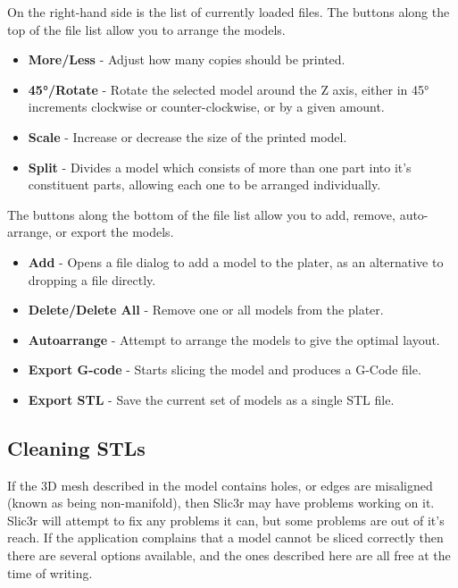 On the right-hand side is the list of currently loaded files.  The buttons along the top of the file list allow you to arrange the models.
\begin{itemize}
	\item \textbf{More/Less}  - Adjust how many copies should be printed.
	\item \textbf{45°/Rotate}  - Rotate the selected model around the Z axis, either in 45° increments clockwise or counter-clockwise, or by a given amount.
	\item \textbf{Scale}  - Increase or decrease the size of the printed model.
	\item \textbf{Split}  - Divides a model which consists of more than one part into it's constituent parts, allowing each one to be arranged individually.
\end{itemize}

The buttons along the bottom of the file list allow you to add, remove, auto-arrange, or export the models.
\begin{itemize}
	\item \textbf{Add}  - Opens a file dialog to add a model to the plater, as an alternative to dropping a file directly.
	\item \textbf{Delete/Delete All}  - Remove one or all models from the plater.
	\item \textbf{Autoarrange}  - Attempt to arrange the models to give the optimal layout.
	\item \textbf{Export G-code}  - Starts slicing the model and produces a G-Code file.
	\item \textbf{Export STL}  - Save the current set of models as a single STL file.
\end{itemize}



\subsection{Cleaning STLs} %
\label{sub:cleaning_stls}
If the 3D mesh described in the model contains holes, or edges are misaligned (known as being non-manifold), then Slic3r may have problems working on it.  Slic3r will attempt to fix any problems it can, but some problems are out of it's reach.  If the application complains that a model cannot be sliced correctly then there are several options available, and the ones described here are all free at the time of writing. 

